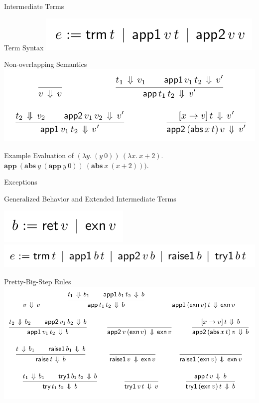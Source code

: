 \documentclass[page number,dvipsnames]{beamer}
\begin{document}
\begin{frame}{Intermediate Terms}
  \begin{block}{Term Syntax}
    \center
    \includegraphics[scale=0.3]{interm.png}
  \end{block}
  \vfill
  \begin{exampleblock}{Non-overlapping Semantics}
    \center
    \includegraphics[scale=0.3]{interm_step.png}
  \end{exampleblock}
\end{frame}

\def\app{\mathbf{app}}
\def\abs{\mathbf{abs}}
\begin{frame}{Example}
  Evaluation of $(\lambda y.~ (y ~0))~ (\lambda x.~ x + 2)$.\\
  $\app~(\abs~ y~ (\app~ y~ 0))~(\abs~ x~ (x+2)))$.
  \vfill
\end{frame}


\begin{frame}{Exceptions}
  \begin{block}{Generalized Behavior and Extended Intermediate Terms}
    \begin{center}
    \includegraphics[scale=0.3]{behavior.png}\hfill
    \includegraphics[scale=0.3]{expr_ex.png}
    \end{center}
  \end{block}
  \vfill
  \begin{exampleblock}{Pretty-Big-Step Rules}
    \center
    \includegraphics[scale=0.3]{ex_rules.png}
  \end{exampleblock}
\end{frame}
\end{document}
